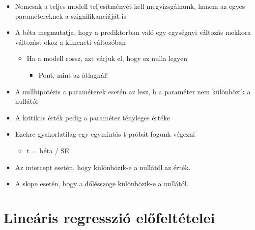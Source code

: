 \documentclass[
  letterpaper,
  DIV=11,
  numbers=noendperiod]{scrreprt}
\providecommand{\tightlist}{%
  \setlength{\itemsep}{0pt}\setlength{\parskip}{0pt}}\usepackage{longtable,booktabs,array}
\begin{document}
\begin{itemize}
\item
  Nemcsak a teljes modell teljesítményét kell megvizsgálnunk, hanem az
  egyes paramétereknek a szignifikanciáját is
\item
  A béta megmutatja, hogy a prediktorban való egy egységnyi változás
  mekkora változást okoz a kimeneti változóban

  \begin{itemize}
  \item
    Ha a modell rossz, azt várjuk el, hogy ez nulla legyen

    \begin{itemize}
    \tightlist
    \item
      Pont, mint az átlagnál!
    \end{itemize}
  \end{itemize}
\item
  A nullhipotézis a paraméterek esetén az lesz, h a paraméter nem
  különbözik a nullától
\item
  A kritikus érték pedig a paraméter tényleges értéke
\item
  Ezekre gyakorlatilag egy egymintás t-próbát fogunk végezni

  \begin{itemize}
  \tightlist
  \item
    t = béta / SE
  \end{itemize}
\item
  Az intercept esetén, hogy különbözik-e a nullától az érték.
\item
  A slope esetén, hogy a dőlésszöge különbözik-e a nullától.
\end{itemize}

\hypertarget{lineuxe1ris-regressziuxf3-elux151feltuxe9telei}{%
\section{Lineáris regresszió
előfeltételei}\label{lineuxe1ris-regressziuxf3-elux151feltuxe9telei}}
\end{document}
